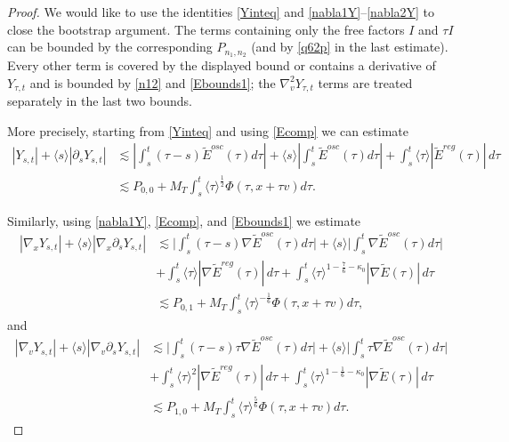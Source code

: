 \documentclass[10pt,a4paper]{amsart}
\theoremstyle{plain}
\begin{document}
\begin{proof}
	We would like to use the identities \eqref{Yinteq} and \eqref{nabla1Y}--\eqref{nabla2Y} to close the bootstrap argument. The terms containing only the free factors $I$ and $\tau I$ can be bounded by the corresponding $P_{n_1,n_2}$ (and by
	\eqref{q62p} in the last
	estimate).  Every other term is covered by the displayed bound or contains
	a derivative of $Y_{\tau,t}$ and is bounded by \eqref{n12} and
	\eqref{Ebounds1}; the
	$\nabla_v^2Y_{\tau,t}$ terms are treated separately in the last two bounds. 
	
	More precisely, starting from \eqref{Yinteq} and using \eqref{Ecomp} we can estimate
	\begin{equation}\label{Ysu1}
		\begin{split}
			|Y_{s,t}|+\langle s\rangle	|\partial_sY_{s,t}|&\lesssim \left|\int_s^t(\tau-s) \widetilde{E}^{osc}(\tau)d\tau\right|+\langle s\rangle\left|\int_s^t \widetilde{E}^{osc}(\tau)d\tau\right|+\int_s^t\langle \tau\rangle| \widetilde{E}^{reg}(\tau)|\,d\tau\\&
			\lesssim 	P_{0,0}+M_T\int_s^t\langle \tau\rangle^{\frac{1}{2}}\Phi(\tau,x+\tau v)d\tau.
		\end{split}
	\end{equation}
	
	Similarly, using \eqref{nabla1Y}, \eqref{Ecomp}, and \eqref{Ebounds1} we estimate
	\begin{equation}\label{Ysu2}
		\begin{split}
			|\nabla_xY_{s,t}|+\langle s\rangle|\nabla_x\partial_sY_{s,t}|&\lesssim \Big|\int_s^t(\tau-s)\nabla \widetilde{E}^{osc}(\tau)d\tau\Big|+\langle s\rangle \Big|\int_s^t\nabla \widetilde{E}^{osc}(\tau)d\tau\Big|\\
			&+\int_s^t\langle \tau\rangle|\nabla \widetilde{E}^{reg}(\tau)|\,d\tau+\int_s^t\langle \tau\rangle^{1-\frac{7}{6}-\kappa_0}|\nabla \widetilde{E}(\tau)|\,d\tau\\
			&\lesssim	P_{0,1}+M_T\int_s^t\langle \tau\rangle^{-\frac{1}{6}}\Phi(\tau,x+\tau v)d\tau,
		\end{split}
	\end{equation}
	and
	\begin{equation}\label{Ysu3}
		\begin{split}
			|\nabla_vY_{s,t}|+\langle s\rangle|\nabla_v\partial_sY_{s,t}|&\lesssim \Big|\int_s^t(\tau-s)\tau\nabla \widetilde{E}^{osc}(\tau)d\tau\Big|+\langle s\rangle \Big|\int_s^t \tau\nabla \widetilde{E}^{osc}(\tau)d\tau\Big|\\
			&+\int_s^t\langle \tau\rangle^2|\nabla \widetilde{E}^{reg}(\tau)|\,d\tau+\int_s^t\langle \tau\rangle^{1-\frac{1}{6}-\kappa_0}|\nabla \widetilde{E}(\tau)|\,d\tau\\
			&\lesssim P_{1,0}+M_T\int_s^t\langle \tau\rangle^{\frac{5}{6}}\Phi(\tau,x+\tau v)d\tau.
		\end{split}
	\end{equation}
	

\end{proof}
\end{document}

